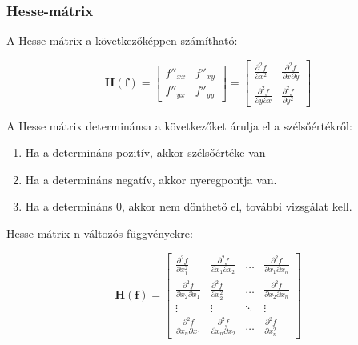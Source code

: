 \documentclass{article}
\begin{document}
\subsubsection{Hesse-mátrix}

A Hesse-mátrix a következőképpen számítható:

\begin{equation*}
    \mathbf{H(f)} = \begin{bmatrix} f''_{xx} & f''_{xy} \\ f''_{yx} & f''_{yy} \end{bmatrix} = \begin{bmatrix} \frac{\partial^2 f}{\partial x^2} & \frac{\partial^2 f}{\partial x \partial y} \\ \frac{\partial^2 f}{\partial y \partial x} & \frac{\partial^2 f}{\partial y^2} \end{bmatrix}
\end{equation*}

A Hesse mátrix determinánsa a következőket árulja el a szélsőértékről:

\begin{enumerate}
    \item Ha a determináns pozitív, akkor szélsőértéke van
    \item Ha a determináns negatív, akkor nyeregpontja van.
    \item Ha a determináns 0, akkor nem dönthető el, további vizsgálat kell.
\end{enumerate}

\vspace{4mm}

Hesse mátrix n változós függvényekre:

\begin{equation*}
    \mathbf{H(f)} = \begin{bmatrix} \frac{\partial^2 f}{\partial x_1^2} & \frac{\partial^2 f}{\partial x_1 \partial x_2} & \ldots & \frac{\partial^2 f}{\partial x_1 \partial x_n} \\ \frac{\partial^2 f}{\partial x_2 \partial x_1} & \frac{\partial^2 f}{\partial x_2^2} & \ldots & \frac{\partial^2 f}{\partial x_2 \partial x_n} \\ \vdots & \vdots & \ddots & \vdots \\ \frac{\partial^2 f}{\partial x_n \partial x_1} & \frac{\partial^2 f}{\partial x_n \partial x_2} & \ldots & \frac{\partial^2 f}{\partial x_n^2} \end{bmatrix}
\end{equation*}
\end{document}
